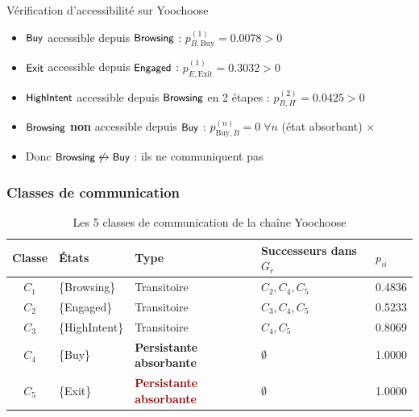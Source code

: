 \documentclass[11pt,a4paper]{article}
\newcommand{\st}[1]{\textsf{\small#1}}
\begin{document}
\begin{exbox}{Vérification d'accessibilité sur Yoochoose}
\begin{itemize}[itemsep=2pt,topsep=3pt]
  \item $\st{Buy}$ accessible depuis $\st{Browsing}$ :
        $p_{B,\text{Buy}}^{(1)} = 0.0078 > 0$ \checkmark
  \item $\st{Exit}$ accessible depuis $\st{Engaged}$ :
        $p_{E,\text{Exit}}^{(1)} = 0.3032 > 0$ \checkmark
  \item $\st{HighIntent}$ accessible depuis $\st{Browsing}$ en 2 étapes :
        $p_{B,H}^{(2)} = 0.0425 > 0$ \checkmark
  \item $\st{Browsing}$ \textbf{non} accessible depuis $\st{Buy}$ :
        $p_{\text{Buy},B}^{(n)} = 0\;\forall n$ (état absorbant) $\times$
  \item Donc $\st{Browsing} \not\leftrightarrow \st{Buy}$ : ils ne communiquent pas
\end{itemize}
\end{exbox}

\subsubsection{Classes de communication}

\begin{table}[H]
\centering
\caption{Les 5 classes de communication de la chaîne Yoochoose}
\label{tab:classes}
\begin{tabular}{cllll}
\toprule
\rowcolor{DarkBlue}
\color{white}\textbf{Classe} &
\color{white}\textbf{États} &
\color{white}\textbf{Type} &
\color{white}\textbf{Successeurs dans $G_r$} &
\color{white}$p_{ii}$ \\
\midrule
\rowcolor{LightBlue}
$C_1$ & \{Browsing\}   & Transitoire &
  $C_2, C_4, C_5$ & 0.4836 \\
\rowcolor{LightGreen}
$C_2$ & \{Engaged\}    & Transitoire &
  $C_3, C_4, C_5$ & 0.5233 \\
\rowcolor{LightOrange}
$C_3$ & \{HighIntent\} & Transitoire &
  $C_4, C_5$      & 0.8069 \\
\rowcolor{LightBuy}
$C_4$ & \{Buy\}  &
  \textcolor{BuyGreen}{\bfseries Persistante absorbante} &
  $\emptyset$ & 1.0000 \\
\rowcolor{LightRed}
$C_5$ & \{Exit\} &
  \textcolor{DarkRed}{\bfseries Persistante absorbante} &
  $\emptyset$ & 1.0000 \\
\bottomrule
\end{tabular}
\end{table}
\end{document}
